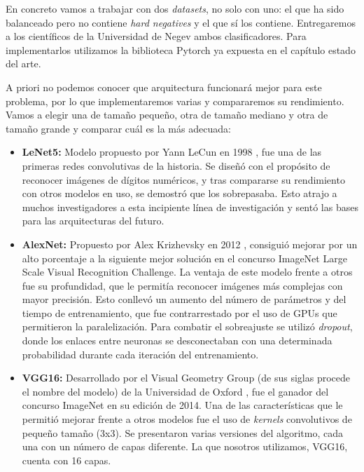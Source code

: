En concreto vamos a trabajar con dos \textit{datasets}, no solo con uno: el que ha sido balanceado pero no contiene \textit{hard negatives} y el que sí los contiene. Entregaremos a los científicos de la Universidad de Negev ambos clasificadores. Para implementarlos utilizamos la biblioteca Pytorch ya expuesta en el capítulo estado del arte.

A priori no podemos conocer que arquitectura funcionará mejor para este problema, por lo que implementaremos varias y compararemos su rendimiento. Vamos a elegir una de tamaño pequeño, otra de tamaño mediano y otra de tamaño grande y comparar cuál es la más adecuada:
\begin{itemize}
    \item \textbf{LeNet5:} Modelo propuesto por Yann LeCun en 1998 \cite{lecun1998gradient}, fue una de las primeras redes convolutivas de la historia. Se diseñó con el propósito de reconocer imágenes de dígitos numéricos, y tras compararse su rendimiento con otros modelos en uso, se demostró que los sobrepasaba. Esto atrajo a muchos investigadores a esta incipiente línea de investigación y sentó las bases para las arquitecturas del futuro.
    \item \textbf{AlexNet:} Propuesto por Alex Krizhevsky en 2012 \cite{krizhevsky2012imagenet}, consiguió mejorar por un alto porcentaje a la siguiente mejor solución en el concurso ImageNet Large Scale Visual Recognition Challenge. La ventaja de este modelo frente a otros fue su profundidad, que le permitía reconocer imágenes más complejas con mayor precisión. Esto conllevó un aumento del número de parámetros y del tiempo de entrenamiento, que fue contrarrestado por el uso de GPUs que permitieron la paralelización. Para combatir el sobreajuste se utilizó \textit{dropout}, donde los enlaces entre neuronas se desconectaban con una determinada probabilidad durante cada iteración del entrenamiento.
    \item \textbf{VGG16:} Desarrollado por el Visual Geometry Group (de sus siglas procede el nombre del modelo) de la Universidad de Oxford \cite{https://doi.org/10.48550/arxiv.1409.1556}, fue el ganador del concurso ImageNet en su edición de 2014. Una de las características que le permitió mejorar frente a otros modelos fue el uso de \textit{kernels} convolutivos de pequeño tamaño (3x3). Se presentaron varias versiones del algoritmo, cada una con un número de capas diferente. La que nosotros utilizamos, VGG16, cuenta con 16 capas.
\end{itemize}

